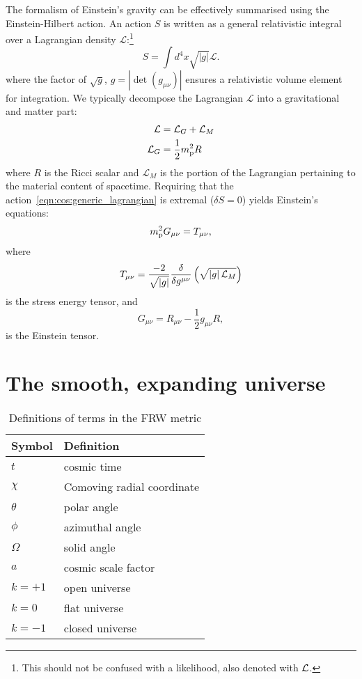 The formalism of Einstein's gravity can be effectively summarised using the Einstein-Hilbert action. An action $S$ is written as a general relativistic integral over a Lagrangian density $\mathcal{L}$:\footnote{This should not be confused with a likelihood, also denoted with $\mathcal{L}$.}
\begin{equation}
  S = \int d^4 x \sqrt{|g|} \mathcal{L}.
  \label{eqn:cos:generic_lagrangian}
\end{equation}
where the factor of $\sqrt{g}$, $g=\left|\det\left( g_{\mu\nu} \right)\right|$ ensures a relativistic volume element for integration.
We typically decompose the Lagrangian $\mathcal{L}$ into a gravitational and matter part:
\begin{align}
  \mathcal{L} &= \mathcal{L}_G + \mathcal{L}_M
  \label{eqn:cos:decomp}\\
  \mathcal{L}_G &= \frac{1}{2} m_{\mathrm{p}}^2 R
  \label{eqn:cos:L_grav}
\end{align}
where $R$ is the Ricci scalar and $\mathcal{L}_M$ is the portion of the Lagrangian pertaining to the material content of spacetime. Requiring that the action~\eqref{eqn:cos:generic_lagrangian} is extremal ($\delta S = 0$) yields Einstein's equations:
\begin{equation}
 m_{\mathrm{p}}^2 G_{\mu\nu} = T_{\mu\nu},
  \label{eqn:cos:einsteins_equations}
\end{equation}
where
\begin{equation}
  T_{\mu\nu} = \frac{-2}{\sqrt{\left|g\right|}}\frac{\delta}{\delta g^{\mu\nu}}\left( \sqrt{\left|g\right| \mathcal{L}_M} \right)
  \label{eqn:cos:SET_fundamantal}
\end{equation}
is the stress energy tensor, and
\begin{equation}
  G_{\mu\nu} = R_{\mu\nu} - \frac{1}{2}g_{\mu\nu} R,
  \label{eqn:cos:einstein_tensor}
\end{equation}
is the Einstein tensor.

\section{The smooth, expanding universe}
\begin{table}
  \centering
\begin{tabular}{ll}
 \toprule
  Symbol & Definition \\
 \midrule
 \midrule
  $t$ & cosmic time \\
  $\chi$ & Comoving radial coordinate \\
  $\theta$ & polar angle \\
  $\phi$ & azimuthal angle \\
  $\Omega$ & solid angle \\
  $a$ & cosmic scale factor \\
  $k=+1$ & open universe \\
  $k=0$ & flat universe \\
  $k=-1$ & closed universe \\
 \bottomrule
\end{tabular}
\caption{Definitions of terms in the FRW metric}\label{tab:cos:metric}
\end{table}


